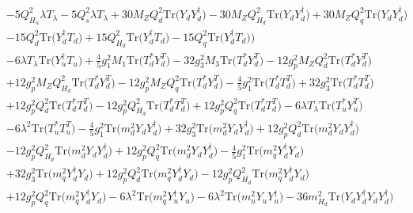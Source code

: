 \begin{align}
 &-5 Q_{H_u}^{2} \lambda T_{\lambda} -5 Q_{s}^{2} \lambda T_{\lambda} +30 M_Z Q_{d}^{2} \mbox{Tr}\Big({Y_d  Y_{d}^{\dagger}}\Big) -30 M_Z Q_{H_d}^{2} \mbox{Tr}\Big({Y_d  Y_{d}^{\dagger}}\Big) +30 M_Z Q_{q}^{2} \mbox{Tr}\Big({Y_d  Y_{d}^{\dagger}}\Big) \nonumber \\ 
 &-15 Q_{d}^{2} \mbox{Tr}\Big({Y_{d}^{\dagger}  T_d}\Big) +15 Q_{H_d}^{2} \mbox{Tr}\Big({Y_{d}^{\dagger}  T_d}\Big) -15 Q_{q}^{2} \mbox{Tr}\Big({Y_{d}^{\dagger}  T_d}\Big) \Big)\nonumber \\ 
 &-6 \lambda T_{\lambda} \mbox{Tr}\Big({Y_{u}^{\dagger}  T_u}\Big) +\frac{4}{5} g_{1}^{2} M_1 \mbox{Tr}\Big({T_d^*  Y_{d}^{T}}\Big) -32 g_{3}^{2} M_3 \mbox{Tr}\Big({T_d^*  Y_{d}^{T}}\Big) -12 g_{p}^{2} M_Z Q_{d}^{2} \mbox{Tr}\Big({T_d^*  Y_{d}^{T}}\Big) \nonumber \\ 
 &+12 g_{p}^{2} M_Z Q_{H_d}^{2} \mbox{Tr}\Big({T_d^*  Y_{d}^{T}}\Big) -12 g_{p}^{2} M_Z Q_{q}^{2} \mbox{Tr}\Big({T_d^*  Y_{d}^{T}}\Big) -\frac{4}{5} g_{1}^{2} \mbox{Tr}\Big({T_d^*  T_{d}^{T}}\Big) +32 g_{3}^{2} \mbox{Tr}\Big({T_d^*  T_{d}^{T}}\Big) \nonumber \\ 
 &+12 g_{p}^{2} Q_{d}^{2} \mbox{Tr}\Big({T_d^*  T_{d}^{T}}\Big) -12 g_{p}^{2} Q_{H_d}^{2} \mbox{Tr}\Big({T_d^*  T_{d}^{T}}\Big) +12 g_{p}^{2} Q_{q}^{2} \mbox{Tr}\Big({T_d^*  T_{d}^{T}}\Big) -6 \lambda T_{\lambda} \mbox{Tr}\Big({T_u^*  Y_{u}^{T}}\Big) \nonumber \\ 
 &-6 \lambda^{2} \mbox{Tr}\Big({T_u^*  T_{u}^{T}}\Big) -\frac{4}{5} g_{1}^{2} \mbox{Tr}\Big({m_d^2  Y_d  Y_{d}^{\dagger}}\Big) +32 g_{3}^{2} \mbox{Tr}\Big({m_d^2  Y_d  Y_{d}^{\dagger}}\Big) +12 g_{p}^{2} Q_{d}^{2} \mbox{Tr}\Big({m_d^2  Y_d  Y_{d}^{\dagger}}\Big) \nonumber \\ 
 &-12 g_{p}^{2} Q_{H_d}^{2} \mbox{Tr}\Big({m_d^2  Y_d  Y_{d}^{\dagger}}\Big) +12 g_{p}^{2} Q_{q}^{2} \mbox{Tr}\Big({m_d^2  Y_d  Y_{d}^{\dagger}}\Big) -\frac{4}{5} g_{1}^{2} \mbox{Tr}\Big({m_q^2  Y_{d}^{\dagger}  Y_d}\Big) \nonumber \\ 
 &+32 g_{3}^{2} \mbox{Tr}\Big({m_q^2  Y_{d}^{\dagger}  Y_d}\Big) +12 g_{p}^{2} Q_{d}^{2} \mbox{Tr}\Big({m_q^2  Y_{d}^{\dagger}  Y_d}\Big) -12 g_{p}^{2} Q_{H_d}^{2} \mbox{Tr}\Big({m_q^2  Y_{d}^{\dagger}  Y_d}\Big) \nonumber \\ 
 &+12 g_{p}^{2} Q_{q}^{2} \mbox{Tr}\Big({m_q^2  Y_{d}^{\dagger}  Y_d}\Big) -6 \lambda^{2} \mbox{Tr}\Big({m_q^2  Y_{u}^{\dagger}  Y_u}\Big) -6 \lambda^{2} \mbox{Tr}\Big({m_u^2  Y_u  Y_{u}^{\dagger}}\Big) -36 m_{H_d}^2 \mbox{Tr}\Big({Y_d  Y_{d}^{\dagger}  Y_d  Y_{d}^{\dagger}}\Big) \nonumber \\ 

\end{align}
